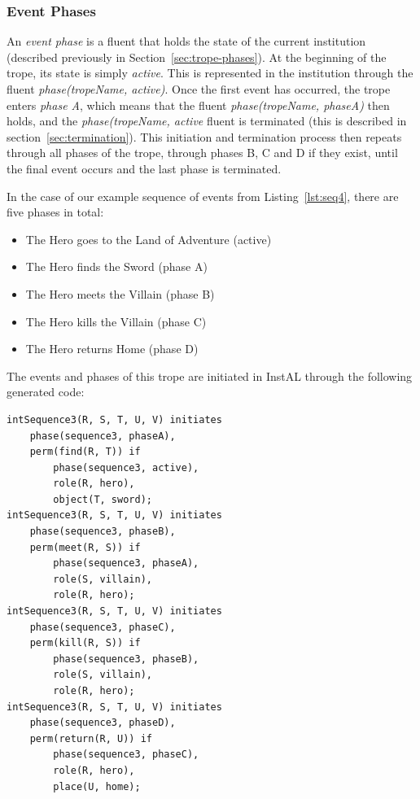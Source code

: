 \documentclass[11pt]{report}
\begin{document}
\subsubsection{Event Phases}
\label{sec:event-phases}
An \emph{event phase} is a fluent that holds the state of the current
institution (described previously in Section~\ref{sec:trope-phases}). At the beginning of the trope, its state is simply \emph{active}.
This is represented in the institution through the fluent \emph{phase(tropeName,
active)}.
Once the first event has occurred, the trope enters \emph{phase A}, which means
that the fluent \emph{phase(tropeName, phaseA)} then holds, and the
\emph{phase(tropeName, active} fluent is terminated (this is described in
section~\ref{sec:termination}). This initiation and termination process then
repeats through all phases of the trope, through phases B, C and D if they
exist, until the final event occurs and the last phase is terminated.

In the case of our example sequence of events from Listing~\ref{lst:seq4}, there
are five phases in total:

\begin{itemize}
  \item The Hero goes to the Land of Adventure (active)
  \item The Hero finds the Sword (phase A)
  \item The Hero meets the Villain (phase B)
  \item The Hero kills the Villain (phase C)
  \item The Hero returns Home (phase D)
\end{itemize}

The events and phases of this trope are initiated in InstAL through the
following generated code:

\begin{lstlisting}[label={lst:initiates}, caption={Institutional event
initiation code for Listing~\ref{lst:seq4}}]
intSequence3(R, S, T, U, V) initiates
    phase(sequence3, phaseA),
    perm(find(R, T)) if
        phase(sequence3, active),
        role(R, hero),
        object(T, sword);
intSequence3(R, S, T, U, V) initiates
    phase(sequence3, phaseB),
    perm(meet(R, S)) if
        phase(sequence3, phaseA),
        role(S, villain),
        role(R, hero);
intSequence3(R, S, T, U, V) initiates
    phase(sequence3, phaseC),
    perm(kill(R, S)) if
        phase(sequence3, phaseB),
        role(S, villain),
        role(R, hero);
intSequence3(R, S, T, U, V) initiates
    phase(sequence3, phaseD),
    perm(return(R, U)) if
        phase(sequence3, phaseC),
        role(R, hero),
        place(U, home);
\end{lstlisting}
\end{document}

